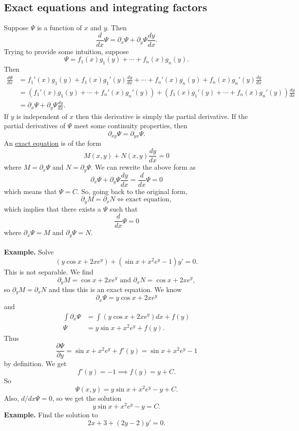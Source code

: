 \documentclass[11pt, oneside]{article}   	%
\begin{document}
\subsection{Exact equations and integrating factors}
Suppose $\Psi$ is a function of $x$ and $y$. Then 
$$
\frac{d}{dx} \Psi = \partial_ x\Psi +\partial_y\Psi \frac{dy}{dx}.
$$
Trying to provide some intuition, suppose
$$
\Psi = f_1(x)g_1(y) + \cdots +f_n(x)g_n(y).
$$
Then 
\begin{align*}
\frac{d \Psi}{dx} &= f_1'(x)g_1(y) + f_1(x)g_1'(y)\frac{dy}{dx} + \cdots + f_n'(x)g_n(y) + f_n(x)g_n'(y)\frac{dy}{dx}\\
& = \left(f_1'(x)g_1(y) + \cdots + f_n'(x)g_n'(y)\right) +  \left(f_1(x)g_1'(y) + \cdots +  f_n(x)g_n'(y) \right)\frac{dy}{dx}\\
&= \partial_x\Psi +\partial_y\Psi\frac{dy}{dx}.
\end{align*}
If $y$ is independent of $x$ then this derivative is simply the partial derivative. If the partial derivatives of $\Psi$ meet some continuity properties, then 
$$
\partial_{xy}\Psi = \partial_{yx}\Psi .
$$
An \underline{exact equation} is of the form
$$
M(x,y) + N(x,y)\frac{dy}{dx} = 0
$$
where $M=\partial_x \Psi$ and $N=\partial_y \Psi$. We can rewrite the above form as
$$
\partial_x \Psi + \partial_y\Psi \frac{dy}{dx} = \frac{d}{dx}\Psi = 0
$$
which means that $\Psi = C$. So, going back to the original form, 
$$
\partial_y M = \partial_x N \iff \textrm{exact equation},
$$
which implies that there exists a $\Psi$ such that 
$$
\frac{d}{dx}\Psi = 0
$$
where $\partial_x \Psi=M$ and $\partial_y \Psi=N$.\\\\
\textbf{Example.} Solve
$$
(y\cos x + 2xe^y) + (\sin x + x^2 e^y-1)y' = 0.
$$
This is not separable. We find 
$$
\partial_y M = \cos x + 2xe^y\textrm{ and } \partial_x N = \cos x + 2xe^y,
$$
so $\partial_y M=\partial_x N $ and thus this is an exact equation. We know 
$$
\partial_x \Psi = y\cos x + 2xe^y
$$ and 
\begin{align*}
\int \partial_x \Psi 	&= \int (y\cos x + 2xe^y)dx + f(y)\\
\Psi				&= y\sin x  + x^2e^y + f(y).
\end{align*}
Thus
$$
\frac{\partial \Psi}{\partial y} = \sin x + x^2e^y + f'(y) = \sin x + x^2e^y - 1
$$
by definition. We get 
$$
f'(y) = -1\implies f(y) = y+C.
$$
So
$$
\Psi(x,y) = y\sin x + x^2e^y - y + C.
$$
Also, $d/dx \Psi = 0 $, so we get the solution 
$$
\boxed{y\sin x + x^2e^y - y = C.}
$$
\textbf{Example.} Find the solution to 
$$
2x + 3 + (2y-2)y' = 0.
$$
\end{document}
